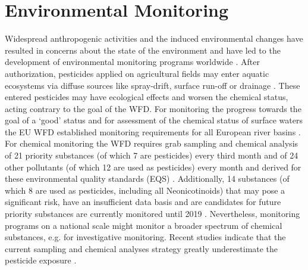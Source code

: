 \section{Environmental Monitoring}

Widespread anthropogenic activities and the induced environmental changes have resulted in concerns about the state of the environment and have led to the development of environmental monitoring programs worldwide \citep{nichols_monitoring_2006}. 
After authorization, pesticides applied on agricultural fields may enter aquatic ecosystems via diffuse sources like spray-drift, surface run-off or drainage \citep{schulz_field_2004, stehle_probabilistic_2013, liess_determination_1999, carter_how_2000}. 
These entered pesticides may have ecological effects and worsen the chemical status, acting contrary to the goal of the WFD. 
For monitoring the progress towards the goal of a `good' status and for assessment of the chemical status of surface waters the EU WFD established monitoring requirements for all European river basins \citep{european_union_directive_2000}. 
For chemical monitoring the WFD requires grab sampling and chemical analysis of 21 priority substances (of which 7 are pesticides) every third month and of 24 other pollutants (of which 12 are used as pesticides) every month and derived for these environmental quality standards (EQS) \citep{european_union_directive_2013}. 
Additionally, 14 substances (of which 8 are used as pesticides, including all Neonicotinoids) that may pose a significant risk, have an insufficient data basis and are candidates for future priority substances are currently monitored until 2019 \citep{european_union_commission_2015}.
Nevertheless, monitoring programs on a national scale might monitor a broader spectrum of chemical substances, e.g. for investigative monitoring. 
Recent studies indicate that the current sampling and chemical analyses strategy greatly underestimate the pesticide exposure \citep{stehle_probabilistic_2013, xing_influences_2013, moschet_how_2014}. 

